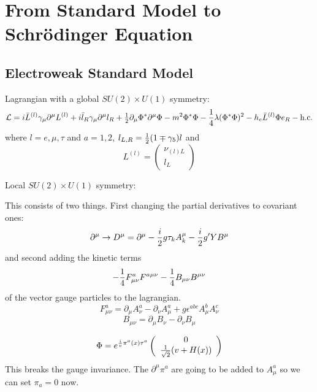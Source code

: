 \section{From Standard Model to Schr\"odinger Equation}

\subsection{Electroweak Standard Model}

Lagrangian with a global $SU(2)\times U(1)$ symmetry:
\begin{equation*}
  {\mathcal L}=i\bar L^{(l)}\gamma_\mu\partial^\mu L^{(l)}+i\bar l_R \gamma_\mu\partial^\mu l_R +{\textstyle{1\over2}} \partial_\mu\Phi^*\partial^\mu\Phi-m^2\Phi^*\Phi-{1\over4} \lambda(\Phi^*\Phi)^2 -h_e\bar L^{(l)} \Phi e_R - \hbox{h.c.}
\end{equation*}
where $l=e,\mu,\tau$ and $a=1,2$, $l_{L,R} = {\textstyle{1\over2}} (1\mp\gamma_5)l$ and
\begin{equation*}
  L^{(l)} = \left( \begin{array}{c} \nu_{(l)L} \\ l_L \end{array} \right)
\end{equation*}

Local $SU(2)\times U(1)$ symmetry:

This consists of two things. First changing the partial derivatives to
covariant ones:
\begin{equation*}
  \partial^\mu \to D^\mu =\partial^\mu-{i\over2}g\tau_k A_k^\mu - {i\over2}g'YB^\mu
\end{equation*}
and second adding the kinetic terms 
\begin{equation*}
  -{1\over4}F^a_{\mu\nu}F^{a\mu\nu}-{1\over4}B_{\mu\nu}B^{\mu\nu}
\end{equation*}
of the vector gauge particles to the lagrangian. 
\begin{equation*}
  F^a_{\mu\nu} = \partial_\mu A^a_\nu-\partial_\nu A^a_\mu+ g\epsilon^{abc}A^b_\mu A^c_\nu
\end{equation*}
\begin{equation*}
  B_{\mu\nu} = \partial_\mu B_\nu-\partial_\nu B_\mu
\end{equation*}

\begin{equation*}
  \Phi = e^{{i\over v}\pi^a(x)\tau^a} \left( \begin{array}{c} 0 \\ {1\over\sqrt{2}}(v+H(x)) \end{array} \right)
\end{equation*}
This breaks the gauge invariance. The $\partial^\mu\pi^a$ are going to be added to $A^a_\mu$ so we can set $\pi_a = 0$ now. 

